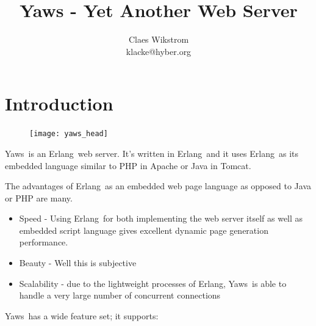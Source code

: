 \documentclass[11pt,oneside,english]{book}
\newcommand{\Erlang}            %
        {{\sc Erlang}}
\newcommand{\Yaws}            %
        {{\sc Yaws}}
\begin{document}
\title{Yaws - Yet Another Web Server}


\author{Claes Wikstrom\\
klacke@hyber.org}





\maketitle
\tableofcontents{}



\chapter{Introduction}


\begin{figure}[h]
\begin{center}

 \texttt{[image: yaws\_head]}

\end{center}
\end{figure}

\Yaws\  is an \Erlang\  web server. It's written in \Erlang\  and it uses
\Erlang\  as its embedded language similar to PHP in Apache or Java in Tomcat.

The advantages of \Erlang\  as an embedded web page language as opposed to
Java or PHP are many.
\begin{itemize}

\item{Speed - Using \Erlang\  for both implementing the web server itself as well
as embedded script language gives excellent dynamic page generation
performance.}

\item{Beauty - Well this is subjective}

\item{Scalability - due to the lightweight processes of \Erlang{}, \Yaws\
is able to handle a very large number of concurrent connections}

\end{itemize}

\Yaws\  has a wide feature set; it supports:
\end{document}
